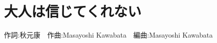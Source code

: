 \section{大人は信じてくれない}

\begin{center}
    \scriptsize{
        作詞:秋元康　作曲:Masayoshi Kawabata　編曲:Masayoshi Kawabata
    }
\end{center}

\vspace{0.7em}

\begin{Parallel}[c]{0.47\textwidth}{0.47\textwidth}

\ParallelLText{
    \footnotesize{
        
    }
}

\ParallelRText{
    \footnotesize{
        
    }
}

\end{Parallel}
